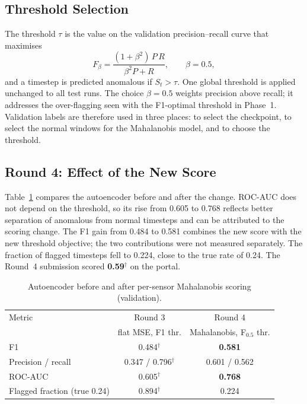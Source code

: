 \documentclass[runningheads]{llncs}
\newcommand{\doc}{$^\dagger$}
\begin{document}
\subsection{Threshold Selection}

The threshold $\tau$ is the value on the validation precision--recall curve that maximises
\begin{equation}
  F_\beta = \frac{(1+\beta^2)\,P\,R}{\beta^2 P + R}, \qquad \beta = 0.5,
\end{equation}
and a timestep is predicted anomalous if $S_t > \tau$. One global threshold is applied unchanged to all test runs. The choice $\beta = 0.5$ weights precision above recall; it addresses the over-flagging seen with the F1-optimal threshold in Phase~1. Validation labels are therefore used in three places: to select the checkpoint, to select the normal windows for the Mahalanobis model, and to choose the threshold.

\subsection{Round 4: Effect of the New Score}

Table~\ref{tab:round4} compares the autoencoder before and after the change. ROC-AUC does not depend on the threshold, so its rise from 0.605 to 0.768 reflects better separation of anomalous from normal timesteps and can be attributed to the scoring change. The F1 gain from 0.484 to 0.581 combines the new score with the new threshold objective; the two contributions were not measured separately. The fraction of flagged timesteps fell to 0.224, close to the true rate of 0.24. The Round~4 submission scored \textbf{0.59}\doc{} on the portal.

\begin{table}[ht]
\centering
\caption{Autoencoder before and after per-sensor Mahalanobis scoring (validation).}\label{tab:round4}
\begin{tabular}{|l|c|c|}
\hline
Metric & Round 3 & Round 4 \\
 & flat MSE, F1 thr. & Mahalanobis, F$_{0.5}$ thr. \\
\hline
F1 & 0.484\doc & \textbf{0.581} \\
Precision / recall & 0.347 / 0.796\doc & 0.601 / 0.562 \\
ROC-AUC & 0.605\doc & \textbf{0.768} \\
Flagged fraction (true 0.24) & 0.894\doc & 0.224 \\
\hline
\end{tabular}
\end{table}
\end{document}
